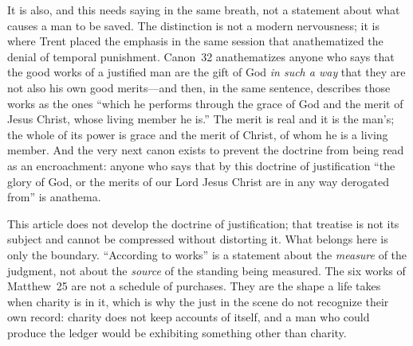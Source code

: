 It is also, and this needs saying in the same breath, not a statement about what causes a man to be saved. The distinction is not a modern nervousness; it is where Trent placed the emphasis in the same session that anathematized the denial of temporal punishment. Canon~32 anathematizes anyone who says that the good works of a justified man are the gift of God \emph{in such a way} that they are not also his own good merits---and then, in the same sentence, describes those works as the ones ``which he performs through the grace of God and the merit of Jesus Christ, whose living member he is.'' The merit is real and it is the man's; the whole of its power is grace and the merit of Christ, of whom he is a living member. And the very next canon exists to prevent the doctrine from being read as an encroachment: anyone who says that by this doctrine of justification ``the glory of God, or the merits of our Lord Jesus Christ are in any way derogated from'' is anathema.

This article does not develop the doctrine of justification; that treatise is not its subject and cannot be compressed without distorting it. What belongs here is only the boundary. ``According to works'' is a statement about the \emph{measure} of the judgment, not about the \emph{source} of the standing being measured. The six works of Matthew~25 are not a schedule of purchases. They are the shape a life takes when charity is in it, which is why the just in the scene do not recognize their own record: charity does not keep accounts of itself, and a man who could produce the ledger would be exhibiting something other than charity.

